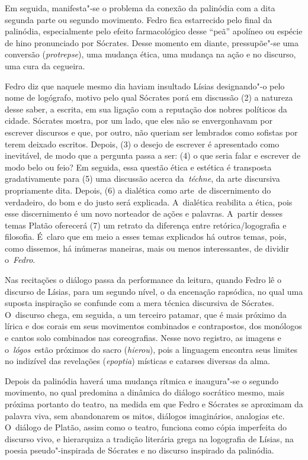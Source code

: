 Em seguida, manifesta"-se o problema da conexão da palinódia com a dita
segunda parte ou segundo movimento. Fedro fica estarrecido pelo final da
palinódia, especialmente pelo efeito farmacológico desse ``peã''
apolíneo ou espécie de hino pronunciado por Sócrates. Desse momento em
diante, pressupõe"-se uma conversão (\emph{protrepse}), uma mudança
ética, uma mudança na ação e no discurso, uma cura da cegueira.

Fedro diz que naquele mesmo dia haviam insultado Lísias designando"-o
pelo nome de logógrafo, motivo pelo qual Sócrates porá em discussão (2)
a natureza desse saber, a escrita, em sua ligação com a reputação dos
nobres políticos da cidade. Sócrates mostra, por um lado, que eles não
se envergonhavam por escrever discursos e que, por outro, não queriam
ser lembrados como sofistas por terem deixado escritos. Depois, (3) o
desejo de escrever é apresentado como inevitável, de modo que a pergunta
passa a ser: (4) o que seria falar e escrever de modo belo ou feio? Em
seguida, essa questão ética e estética é transposta gradativamente para
(5) uma discussão acerca da~\emph{téchne}, da arte discursiva
propriamente dita. Depois, (6) a dialética como arte~de
discernimento do verdadeiro, do bom e do justo será explicada. 
A~dialética reabilita a ética, pois esse discernimento é um novo norteador
de ações e palavras. A~partir desses temas Platão oferecerá (7) um
retrato da diferença entre retórica/\allowbreak{}logografia e filosofia. É~claro que
em meio a esses temas explicados há outros temas, pois, como dissemos,
há inúmeras maneiras, mais ou menos interessantes, de dividir
o~\emph{Fedro}.

Nas recitações o diálogo passa da performance da leitura, quando Fedro
lê o discurso de Lísias, para um segundo nível, o da encenação
rapsódica, no qual uma suposta inspiração se confunde com a mera técnica
discursiva de Sócrates. O~discurso chega, em seguida, a um terceiro
patamar, que é mais próximo da lírica e dos corais em seus movimentos
combinados e contrapostos, dos monólogos e cantos solo combinados nas
coreografias. Nesse novo registro, as imagens e o~\emph{lógos}~estão
próximos do sacro (\emph{hierou}), pois a linguagem encontra seus
limites no indizível das revelações (\emph{epoptia}) místicas e catarses
diversas da alma.

Depois da palinódia haverá uma mudança rítmica e inaugura"-se o segundo
movimento, no qual predomina a dinâmica do diálogo socrático mesmo, mais
próxima portanto do teatro, na medida em que Fedro e Sócrates se
aproximam da palavra viva, sem abandonarem os mitos, diálogos
imaginários, analogias etc. O~diálogo de Platão, assim como o teatro,
funciona como cópia imperfeita do discurso vivo, e hierarquiza a
tradição literária grega na logografia de Lísias, na poesia
pseudo"-inspirada de Sócrates e no discurso inspirado da palinódia.

